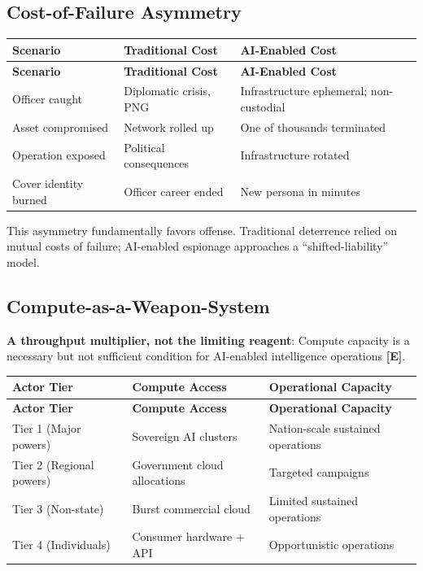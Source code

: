 \documentclass[11pt,letterpaper]{article}
\begin{document}
\subsection{Cost-of-Failure Asymmetry}

{\small
\begin{longtable}{L{3.5cm}L{4cm}L{5cm}}
\toprule
\textbf{Scenario} & \textbf{Traditional Cost} & \textbf{AI-Enabled Cost} \\
\midrule
\endfirsthead
\toprule
\textbf{Scenario} & \textbf{Traditional Cost} & \textbf{AI-Enabled Cost} \\
\midrule
\endhead
Officer caught & Diplomatic crisis, PNG & Infrastructure ephemeral; non-custodial \\*
Asset compromised & Network rolled up & One of thousands terminated \\
Operation exposed & Political consequences & Infrastructure rotated \\*
Cover identity burned & Officer career ended & New persona in minutes \\
\bottomrule
\end{longtable}}

This asymmetry fundamentally favors offense. Traditional deterrence relied on mutual costs of failure; AI-enabled espionage approaches a ``shifted-liability'' model.

\subsection{Compute-as-a-Weapon-System}

\textbf{A throughput multiplier, not the limiting reagent}: Compute capacity is a necessary but not sufficient condition for AI-enabled intelligence operations \textbf{[E]}.

{\small
\begin{longtable}{L{3cm}L{4cm}L{5.5cm}}
\toprule
\textbf{Actor Tier} & \textbf{Compute Access} & \textbf{Operational Capacity} \\
\midrule
\endfirsthead
\toprule
\textbf{Actor Tier} & \textbf{Compute Access} & \textbf{Operational Capacity} \\
\midrule
\endhead
Tier 1 (Major powers) & Sovereign AI clusters & Nation-scale sustained operations \\*
Tier 2 (Regional powers) & Government cloud allocations & Targeted campaigns \\
Tier 3 (Non-state) & Burst commercial cloud & Limited sustained operations \\*
Tier 4 (Individuals) & Consumer hardware + API & Opportunistic operations \\
\bottomrule
\end{longtable}}
\end{document}
